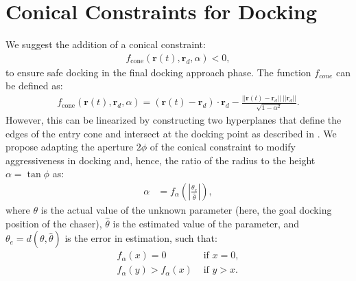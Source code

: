 \chapter{Conical Constraints for Docking}
\label{app:conical-constraints}
We suggest the addition of a conical constraint:
\begin{align}
    f_{\text{cone}}(\bm{r}(t), \bm{r}_d, \alpha)<0, \label{eqn:conical-constraint}
\end{align}
to ensure safe docking in the final docking approach phase. The function $f_{cone}$ can be defined as:
\begin{align}
    f_{\text{cone}}(\bm{r}(t), \bm{r}_d, \alpha)=\left(\bm{r}(t)-\bm{r}_d\right)\cdot\bm{r}_d-\frac{||\bm{r}(t)-\bm{r}_d||\ ||\bm{r}_d||}{\sqrt{1-\alpha^2}}.
\end{align}
However, this can be linearized by constructing two hyperplanes that define the edges of the entry cone and intersect at the docking point as described in \cite{park2017nonlinear}.
We propose adapting the aperture $2\phi$ of the conical constraint to modify aggressiveness in docking and, hence, the ratio of the radius to the height $\alpha=\tan\phi$ as:
\begin{align}
    \alpha&=f_\alpha\left(\left|\frac{\theta_e}{\hat{\theta}}\right|\right),
\end{align}
where $\theta$ is the actual value of the unknown parameter (here, the goal docking position of the chaser), $\hat{\theta}$ is the estimated value of the parameter, and $\theta_e=d(\theta,\hat{\theta})$ is the error in estimation, such that:
\begin{align}
    f_\alpha(x) =           0 & \text{ if } x = 0,\\
    f_\alpha(y) > f_\alpha(x) & \text{ if } y > x.
\end{align}
